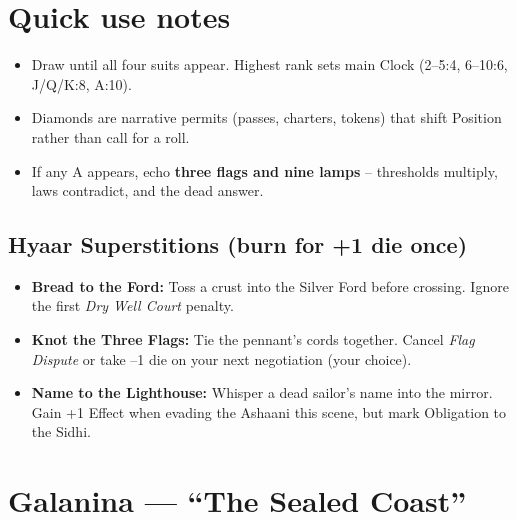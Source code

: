 \documentclass[11pt]{book}
\begin{document}
\section*{Quick use notes}
\begin{itemize}
\item Draw until all four suits appear. Highest rank sets main Clock (2–5:4, 6–10:6, J/Q/K:8, A:10).
\item Diamonds are narrative permits (passes, charters, tokens) that shift Position rather than call for a roll.
\item If any A appears, echo \textbf{three flags and nine lamps} – thresholds multiply, laws contradict, and the dead answer.
\end{itemize}

\subsection*{Hyaar Superstitions (burn for +1 die once)}
\begin{itemize}
\item \textbf{Bread to the Ford:} Toss a crust into the Silver Ford before crossing. Ignore the first \textit{Dry Well Court} penalty.
\item \textbf{Knot the Three Flags:} Tie the pennant’s cords together. Cancel \textit{Flag Dispute} or take –1 die on your next negotiation (your choice).
\item \textbf{Name to the Lighthouse:} Whisper a dead sailor’s name into the mirror. Gain +1 Effect when evading the Ashaani this scene, but mark Obligation to the Sidhi.
\end{itemize}


\section{Galanina — ``The Sealed Coast''}
\label{sec:galanina}
\end{document}
